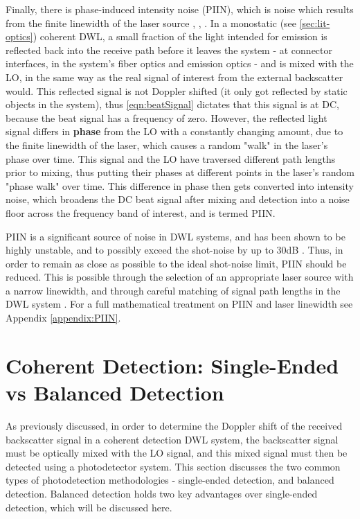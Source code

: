     
    Finally, there is phase-induced intensity noise (PIIN), which is noise which results from the finite linewidth of the laser source \cite{cariou2006laser}, \cite{jiang_performance_2019}, \cite{harris_role_1998}. In a monostatic (see \autoref{sec:lit-optics}) coherent DWL, a
    small fraction of the light intended for emission is reflected back into the
    receive path before it leaves the system - at connector interfaces, in the
     system's fiber optics and emission optics - and is mixed with the LO, in the same way as the real signal of interest from the external backscatter would. This reflected signal is not Doppler shifted (it only got reflected by static objects in the system), thus \autoref{eqn:beatSignal} dictates that this signal is at DC, because the beat signal has a frequency of zero. However, the reflected light signal differs in \textbf{phase} from the LO with a constantly changing amount, due to the finite linewidth of the laser, which causes a random "walk" in the laser's phase over time. This signal and the LO have traversed different path lengths prior to mixing, thus putting their phases at different points in the laser's random "phase walk" over time. This difference in phase then gets converted into intensity noise, which broadens the DC beat signal after mixing and detection into a noise floor across the frequency band of interest, and is termed PIIN. 
    
    PIIN is a significant source of noise in DWL systems, and has been shown to be highly unstable, and to possibly exceed the shot-noise by up to 30dB \cite{harris_role_1998}. Thus, in order to remain as close as possible to the ideal shot-noise limit, PIIN should be reduced. This is possible through the selection of an appropriate laser source with a narrow linewidth, and through careful matching of signal path lengths in the DWL system \cite{harris_role_1998}\cite{cariou2006laser}. For a full mathematical treatment on PIIN and laser linewidth see Appendix \ref{appendix:PIIN}.
    
    \section{Coherent Detection: Single-Ended vs Balanced Detection} \label{sec:lit-BalancedDetection}
    
    As previously discussed, in order to determine the Doppler shift of the received backscatter signal in a coherent detection DWL system, the backscatter signal must be optically mixed with the LO signal, and this mixed signal must then be detected using a photodetector system. This section discusses the two common types of photodetection methodologies - single-ended detection, and balanced detection. Balanced detection holds two key advantages over single-ended detection, which will be discussed here.


